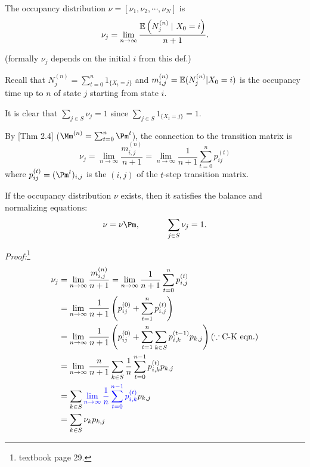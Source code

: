 \documentclass[english,10pt]{beamer}
\begin{document}
\begin{frame}
\begin{definition}%
The occupancy distribution $\nu=[\nu_1,\nu_2,\cdots,\nu_N]$ is 
\[\nu_{j}=\lim_{n\to\infty}\frac{\operatorname{\mathbb E}\left(N_{j}^{(n)}\: \vert ~ X_{0}=i\right)}{n+1}.
\]
\end{definition}%
(formally  $\nu_j$     depends on the initial $i$ from this def.)

\biz[<+->]
\item
Recall  that $N_j^{(n)}=\sum_{t=0}^n 1_{\{X_t=j\}} $ 
and $m_{i,j}^{(n)}=\operatorname{\mathbb E} (N_j^{(n)}|X_0=i)$ is the occupancy time up to $n$ of state $j$ starting from
state $i$.


\item
It is clear that $\sum_{j\in S}\nu_{j}=1$ since $\sum_{j\in S} 1_{\{X_t=j\}} = 1$.
\item
By [Thm 2.4] ($\Mm^{(n)}=\sum_{t=0}^n \Pm^{t}$), the connection to the transition matrix is 
\[ \nu_{j}=\lim_{n\to\infty}\frac{ m_{i,j}^{(n)} }{n+1}
= \lim_{n\to\infty} \frac{ 1}  {n+1} \sum_{t=0}^np^{(t)}_{ij}  \]
where $p^{(t)}_{ij}=(\Pm^t)_{i,j}$ is the $(i,j)$
of the $t$-step transition matrix.
\eiz


\end{frame}



\frame
{


 \begin{theorem}[Thm 2.7]
If the occupancy distribution $ \nu$ exists, then it satisfies
the  balance and normalizing equations: 
\[
\nu = \nu \Pm,  
~~~~~~~~~~
\sum_{j \in S}\nu_{j}=1.
\]
\end{theorem}{\it Proof:}\footnote{  textbook page 29.} 
\vspace {-15pt}
\[
\begin{split}
 \nu_{j}&=\lim_{n\to\infty}\frac{ m_{i,j}^{(n)} }{n+1}
= \lim_{n\to\infty} \frac{ 1}  {n+1} \sum_{t=0}^n  p^{(t)}_{i,j}\\
&=\lim_{n\to\infty} \frac{ 1}  {n+1}
\left(  p^{(0)}_{ij}  +\sum_{t=1}^n  p^{(t)}_{i,j} \right)
\\
&=\lim_{n\to\infty} \frac{ 1}  {n+1}
\left(  p^{(0)}_{ij}+\sum_{t=1}^n \sum_{k\in S} p^{(t-1)}_{i,k} p_{k,j} \right)
(\because \mbox{C-K eqn.})
\\
&=\lim_{n\to\infty} \frac{ n}  {n+1}
  \sum_{k\in S} \frac{1}{n}\sum_{t=0}^{n-1}   p^{(t)}_{i,k} p_{k,j} 
  \\
  &=
  \sum_{k\in S}  {\color{blue}{\lim_{n\to\infty} \frac{1}{n}\sum_{t=0}^{n-1}   p^{(t)}_{i,k}}} p_{k,j} \\
  &= \sum_{k\in S}  \nu_k p_{k,j}
\end{split}
\]


}
\end{document}
